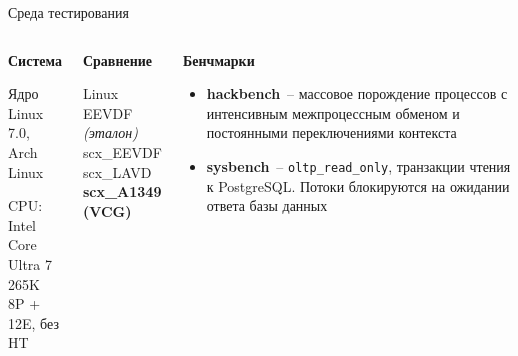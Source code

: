 \documentclass[aspectratio=169,11pt]{beamer}
\begin{document}
\begin{frame}{Среда тестирования}
        \begin{columns}[T]
                \begin{shadowbox}
                        \textbf{Система}

                        \vspace{0.25em}
                        \footnotesize
                        Ядро Linux 7.0,\\ Arch Linux

                        \vspace{0.25em}
                        CPU: Intel Core\\ Ultra 7 265K\\
                        8P + 12E, без HT
                \end{shadowbox}

                \begin{shadowbox}
                        \textbf{Сравнение}

                        \vspace{0.2em}
                        \footnotesize
                        Linux EEVDF\\
                        \textit{(эталон)}\\[0.2em]
                        scx\_EEVDF\\[0.2em]
                        scx\_LAVD\\[0.2em]
                        \textbf{scx\_A1349 (VCG)}
                \end{shadowbox}

                \begin{shadowbox}
                        \textbf{Бенчмарки}

                        \vspace{0.12cm}
                        \footnotesize
                \begin{itemize}\setlength{\itemsep}{0.12cm}\setlength{\parskip}{0pt}
                                \item \textbf{hackbench}~-- массовое
                                        порождение процессов с интенсивным
                                        межпроцессным обменом и постоянными
                                        переключениями контекста

                                \item \textbf{sysbench}~--
                                        \texttt{oltp\_read\_only}, транзакции
                                        чтения к PostgreSQL. Потоки
                                        блокируются на ожидании ответа базы данных


\end{itemize}
\end{shadowbox}
\end{columns}
\end{frame}
\end{document}
